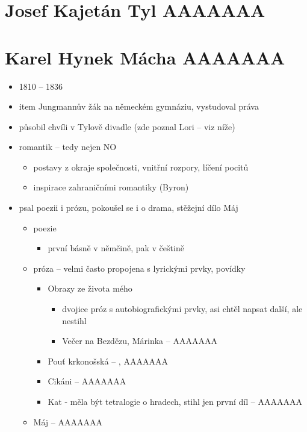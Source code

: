 \documentclass{article}
\begin{document}
\section{Josef Kajetán Tyl AAAAAAA}

\section{Karel Hynek Mácha AAAAAAA}
\begin{itemize}
  \item 1810 -- 1836
  \item item Jungmannův žák na německém gymnáziu, vystudoval práva
  \item působil chvíli v Tylově divadle (zde poznal Lori -- viz níže)
  \item {} romantik -- tedy nejen NO
  \begin{itemize}
    \item postavy z okraje společnosti, vnitřní rozpory, líčení pocitů
    \item inspirace zahraničními romantiky (Byron)
  \end{itemize}
  \item psal poezii i prózu, pokoušel se i o drama, stěžejní dílo Máj
  \begin{itemize}
    \item poezie
    \begin{itemize}
      \item první básně v němčině, pak v češtině
    \end{itemize}
    \item próza -- velmi často propojena s lyrickými prvky, povídky
    \begin{itemize}
      \item Obrazy ze života mého
      \begin{itemize}
        \item dvojice próz s autobiografickými prvky, asi chtěl napsat další, ale nestihl
        \item Večer na Bezdězu, Márinka -- AAAAAAA
      \end{itemize}
      \item Pouť krkonošská -- , AAAAAAA
      \item Cikáni -- AAAAAAA
      \item Kat - měla být tetralogie o hradech, stihl jen první díl -- AAAAAAA
    \end{itemize}
    \item Máj -- AAAAAAA
  \end{itemize}
\end{itemize}
\end{document}
